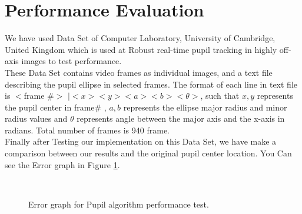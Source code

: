 \section{Performance Evaluation} 
	We have used Data Set of Computer Laboratory, University of Cambridge, United Kingdom which is used at Robust real-time pupil tracking in highly off-axis images to test performance. \cite{swirski} \\
	These Data Set contains video frames as individual images, and a text file describing the pupil ellipse in selected frames. The format of each line in text file is $<$frame \#$>$ $| <x> <y> <a> <b> < \theta >$, such that $ x , y$ represents the pupil center in frame\# , $ a, b$ represents the ellipse major radius and minor radius  values and $\theta$ represents angle between the major axis and the x-axis in radians. Total number of frames is 940 frame. \\
	Finally after Testing our implementation on this Data Set, we have make a comparison between our results and the original pupil center location. You Can see the Error graph in Figure \ref{fig:ErrorGraph}.\cite{pupil}
		

\begin{figure}[]
\begin{dBox}
\centering
  \mbox{
   }
   \caption{Error graph for Pupil algorithm performance test.
   \label{fig:ErrorGraph} }   
\end{dBox}   
\end{figure}
